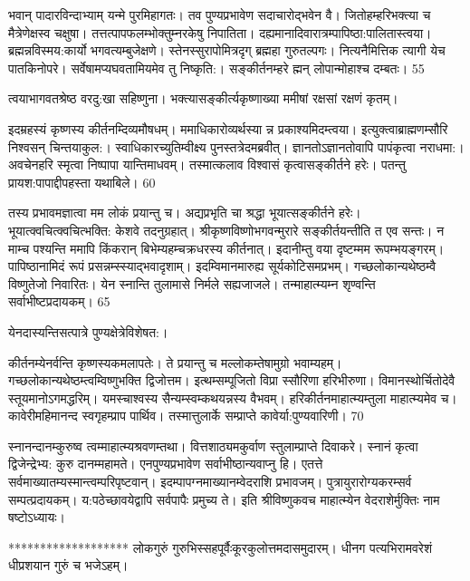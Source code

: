 भवान् पादारविन्दाभ्याम् यन्मे पुरमिहागतः।
तव पुण्यप्रभावेण सदाचारोद्भवेन वै।
जितोहम्हरिभक्त्या च मैत्रेणेक्षस्व चक्षुषा।
तत्तत्पापफलम्भोक्तुम्नरकेषु निपातिता।
दह्यमानादिवारात्रम्पापिष्ठा:पालितास्त्वया।
ब्रह्मन्नविस्मय:कार्यो भगवत्यम्बुजेक्षणे।
स्तेनस्सुरापोमित्रदृग् ब्रह्महा गुरुतल्पगः।
नित्यनैमित्तिक त्यागी येच पातकिनोपरे।
सर्वेषामप्यघवतामियमेव तु निष्कृति:।
सङ्कीर्तनम्हरे ह्मन् लोपान्मोहाश्च दम्बतः।
55

त्वयाभागवतश्रेष्ठ वरदु:खा सहिष्णुना।
भक्त्यासङ्कीर्त्यकृष्णाख्या ममीषां रक्षसां रक्षणं कृतम्।

इदम्रहस्यं कृष्णस्य कीर्तनम्दिव्यमौषधम्।
ममाधिकारोव्यर्थस्या न्न प्रकाश्यमिदम्त्वया।
इत्युक्त्वाब्राह्मणम्सौरि निश्वसन् चिन्तयाकुल:।
स्वाधिकारच्युतिम्वीक्ष्य पुनस्तत्रेदमब्रवीत्।
ज्ञानतोऽज्ञानतोवापि पापंकृत्वा नराधमा:।
अवचेनहरि स्मृत्वा निष्पापा यान्तिमाधवम्।
तस्मात्कलाव विश्वासं कृत्वासङ्कीर्तने हरेः।
पतन्तु प्रायश:पापाद्दीपहस्ता यथाबिले।
60

तस्य प्रभावमज्ञात्वा मम लोकं प्रयान्तु च।
अद्यप्रभृति चा श्रद्धा भूयात्सङ्कीर्तने हरेः।
भूयात्क्वचित्क्वचित्भक्ति: केशवे तदनुग्रहात्।
श्रीकृष्णविष्णोभगवन्मुरारे
सङ्कीर्तयन्तीति त एव सन्तः।
न माम्च पश्यन्ति ममापि
किंकरान् बिभेम्यहम्चक्रधरस्य कीर्तनात्।
इदानीम्तु वया दृष्टम्मम रूपम्भयङ्गरम्।
पापिष्ठानामिदं रूपं प्रसन्नम्स्स्याद्भवादृशाम्।
इदम्विमानमारुह्य सूर्यकोटिसमप्रभम्।
गच्छलोकान्यथेष्ठम्वै विष्णुतेजो निवारितः।
येन स्नान्ति तुलामासे निर्मले सह्यजाजले।
तन्माहात्म्यम्न शृण्वन्ति सर्वाभीष्टप्रदायकम्।
65

येनदास्यन्तिसत्पात्रे पुण्यक्षेत्रेविशेषत:।

कीर्तनम्येनर्वन्ति कृष्णस्यकमलापतेः।
ते प्रयान्तु च मल्लोकम्तेषामुग्रो भवाम्यहम्।
गच्छलोकान्यथेष्ठम्त्वम्विष्णुभक्ति द्विजोत्तम।
इत्थम्सम्पूजितो विप्रा स्सौरिणा हरिभीरुणा।
विमानस्थोर्चितोदेवै स्तूयमानोऽगमद्धरिम्।
यमस्चाश्वस्य सैन्यम्स्वम्कथयन्नस्य वैभवम्।
हरिकीर्तनमाहात्म्यम्तुला माहात्म्यमेव च।
कावेरीमहिमानन्द स्वगृहम्प्राप पार्थिव।
तस्मात्तुलार्के सम्प्राप्ते कावेर्या:पुण्यवारिणी।
70

स्नानन्दानम्कुरुष्व त्वम्माहात्म्यश्रवणम्तथा।
वित्तशाठ्यमकुर्वाण स्तुलाम्प्राप्ते दिवाकरे।
स्नानं कृत्वा द्विजेन्द्रेभ्य: कुरु दानम्महामते।
एनपुण्यप्रभावेण सर्वाभीष्ठान्यवाप्नु हि।
एतत्ते सर्वमाख्यातम्यस्मान्त्वम्परिपृष्टवान्।
इदम्पापग्नमाख्यानम्वेदराशि प्रभावजम्।
पुत्रायुरारोग्यकरम्सर्व सम्पत्प्रदायकम्।
य:पठेच्छावयेद्वापि सर्वपापैः प्रमुच्य ते।
इति श्रीविष्णुकवच माहात्म्येन वेदराशेर्मुक्तिः नाम
षष्टोऽध्यायः।

*******************
लोकगुरुं गुरुभिस्सहपूर्वैःकूरकुलोत्तमदासमुदारम्।
धीनग पत्यभिरामवरेशं धीप्रशयान गुरुं च भजेऽहम्।

